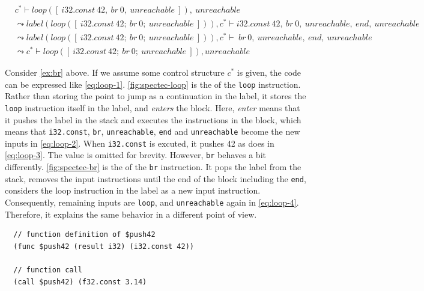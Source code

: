  \\
\begin{align}
  &c^*
  \vdash
  loop([ ~ i32.const ~ 42, ~ br ~ 0, ~ unreachable ~ ]), ~ unreachable
  \label{eq:loop-1} \\
&\leadsto
  label(loop([ ~ i32.const ~ 42; ~ br ~ 0; ~ unreachable ~ ])), c^*
  \vdash
  i32.const ~ 42, ~ br ~ 0, ~ unreachable, ~ end, ~ unreachable
  \label{eq:loop-2} \\
  &\leadsto
  label(loop([ ~ i32.const ~ 42; ~ br ~ 0; ~ unreachable ~ ])), c^*
  \vdash
  ~ br ~ 0, ~ unreachable, ~ end, ~ unreachable
  \label{eq:loop-3} \\
&\leadsto
  c^*
  \vdash
  loop([ ~ i32.const ~ 42; ~ br ~ 0; ~ unreachable ~ ]), unreachable
  \label{eq:loop-4}
\end{align}

Consider \cref{ex:br} above.
If we assume some control structure $c^*$ is given, the code can be expressed
like \cref{eq:loop-1}.
\cref{fig:spectec-loop} is the \spectecp{} of the \texttt{loop} instruction.
Rather than storing the point to jump as a continuation in the label, it stores
the \texttt{loop} instruction itself in the label, and \textit{enters} the
block.
Here, \textit{enter} means that it pushes the label in the stack and executes
the instructions in the block, which means that \texttt{i32.const},
\texttt{br}, \texttt{unreachable}, \texttt{end} and \texttt{unreachable} become
the new inputs in \cref{eq:loop-2}.
When \texttt{i32.const} is excuted, it pushes 42 as \officialp{} does
in \cref{eq:loop-3}.
The value is omitted for brevity.
However, \texttt{br} behaves a bit differently.
\cref{fig:spectec-br} is the \spectecp{} of the \texttt{br} instruction.
It pops the label from the stack, removes the input instructions until the end
of the block including the \texttt{end}, considers the loop instruction in the
label as a new input instruction.
Consequently, remaining inputs are \texttt{loop}, and \texttt{unreachable}
again in \cref{eq:loop-4}.
Therefore, it explains the same behavior in a different point of view.


\begin{example}
\label{ex:invoke}
\begin{verbatim}
  // function definition of $push42
  (func $push42 (result i32) (i32.const 42))

  // function call
  (call $push42) (f32.const 3.14)
\end{verbatim}
\end{example}

